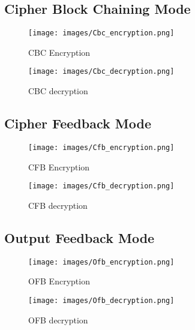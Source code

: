\documentclass[a4paper]{article}
\begin{document}
\subsection{Cipher Block Chaining Mode}

\begin{figure}[!ht]
	\begin{center}
		\texttt{[image: images/Cbc\_encryption.png]}
	\end{center}
	\caption{CBC Encryption}
	\label{fig:cbc_en}
\end{figure}
\begin{figure}[!ht]
	\begin{center}
		\texttt{[image: images/Cbc\_decryption.png]}
	\end{center}
	\caption{CBC decryption}
	\label{fig:cbc_de}
\end{figure}

\subsection{Cipher Feedback Mode}

\begin{figure}[!ht]
	\begin{center}
		\texttt{[image: images/Cfb\_encryption.png]}
	\end{center}
	\caption{CFB Encryption}
	\label{fig:cfb_en}
\end{figure}
\begin{figure}[!ht]
	\begin{center}
		\texttt{[image: images/Cfb\_decryption.png]}
	\end{center}
	\caption{CFB decryption}
	\label{fig:cfb_de}
\end{figure}

\subsection{Output Feedback Mode}

\begin{figure}[!ht]
	\begin{center}
		\texttt{[image: images/Ofb\_encryption.png]}
	\end{center}
	\caption{OFB Encryption}
	\label{fig:ofb_en}
\end{figure}
\begin{figure}[!ht]
	\begin{center}
		\texttt{[image: images/Ofb\_decryption.png]}
	\end{center}
	\caption{OFB decryption}
	\label{fig:ofb_de}
\end{figure}
\end{document}
